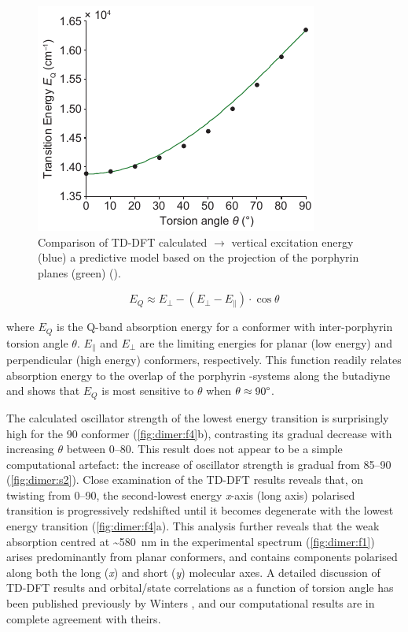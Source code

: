 		\begin{figure}[ht!]
			\centering\includegraphics{figures/dimer/Figure-5.pdf} 
			\caption[]{Comparison of TD-DFT calculated $\rightarrow{}$ vertical excitation energy (blue)  a predictive model based on the projection of the porphyrin planes (green) ().}
			\label{fig:dimer:f5}
		\end{figure}

		\begin{equation}\label{eqn:qband-cos}
		E_Q \approx E_\bot - (E_\bot - E_\parallel)\cdot \cos \theta
		\end{equation}

		\noindent{}where $E_Q$ is the Q-band absorption energy for a conformer with inter-porphyrin torsion angle $\theta$. $E_\parallel$ and $E_\bot$ are the limiting energies for planar (low energy) and perpendicular (high energy) conformers, respectively. This function readily relates absorption energy to the overlap of the porphyrin \pii-systems along the butadiyne and shows that $E_Q$ is most sensitive to $\theta$ when $\theta \approx 90\degree$.

		The calculated oscillator strength of the lowest energy transition is surprisingly high for the 90\textdegree{} conformer (\autoref{fig:dimer:f4}b), contrasting its gradual decrease with increasing $\theta$ between 0–80\textdegree{}. This result does not appear to be a simple computational artefact: the increase of oscillator strength is gradual from 85--90\textdegree{} (\autoref{fig:dimer:s2}). Close examination of the TD-DFT results reveals that, on twisting from 0--90\textdegree{}, the second-lowest energy \textit{x}-axis (long axis) polarised transition is progressively redshifted until it becomes degenerate with the lowest energy transition (\autoref{fig:dimer:f4}a). This analysis further reveals that the weak absorption centred at \textasciitilde{}\SI{580}{\nano\metre} in the experimental spectrum (\autoref{fig:dimer:f1}) arises predominantly from planar conformers, and contains components polarised along both the long (\textit{x}) and short (\textit{y}) molecular axes. A detailed discussion of TD-DFT results and orbital/state correlations as a function of torsion angle has been published previously by Winters , and our computational results are in complete agreement with theirs.\autocite{Winters2007}

